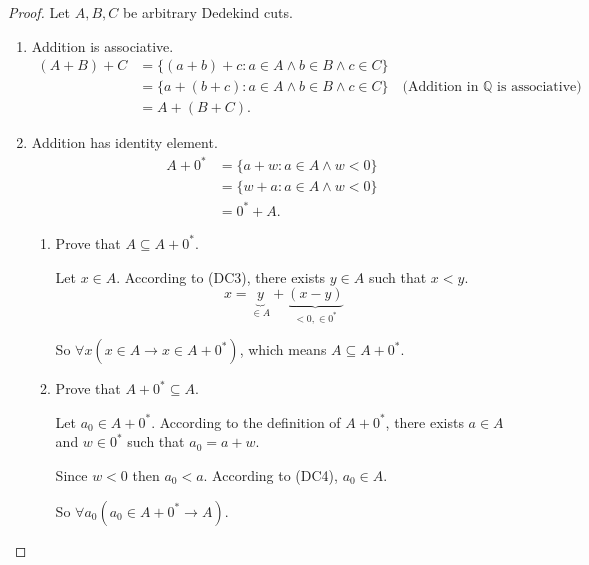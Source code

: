\begin{proof}
    Let $A, B, C$ be arbitrary Dedekind cuts.
    \begin{enumerate}[label = (F\arabic*)]
        \item Addition is associative.
              \begin{align*}
                  (A + B) + C & = \{ (a + b) + c : a\in A\land b\in B\land c\in C \}                                                       \\
                              & = \{ a + (b + c) : a\in A\land b\in B\land c\in C \} \quad\text{(Addition in $\mathbb{Q}$ is associative)} \\
                              & = A + (B + C).
              \end{align*}
        \item Addition has identity element.
              \begin{align*}
                  A + {0}^{*} & = \{ a + w : a\in A\land w < 0 \} \\
                              & = \{ w + a : a\in A\land w < 0 \} \\
                              & = {0}^{*} + A.
              \end{align*}

              \begin{enumerate}[label={\textbf{Step \arabic*.}}]
                  \item Prove that $A \subseteq A + {0}^{*}$.

                        Let $x\in A$. According to (DC3), there exists $y\in A$ such that $x < y$.
                        \[
                            x = \underbrace{y}_{\in A} + \underbrace{(x - y)}_{< 0, \in {0}^{*}}
                        \]

                        So $\forall x(x\in A \rightarrow x\in A + {0}^{*})$, which means $A \subseteq A + {0}^{*}$.
                  \item Prove that $A + {0}^{*} \subseteq A$.

                        Let $a_{0}\in A + {0^{*}}$. According to the definition of $A + {0}^{*}$, there exists $a\in A$ and $w\in {0}^{*}$ such that $a_{0} = a + w$.

                        Since $w < 0$ then $a_{0} < a$. According to (DC4), $a_{0}\in A$.

                        So $\forall a_{0}(a_{0}\in A + {0}^{*} \rightarrow A)$.
              \end{enumerate}


\end{enumerate}
\end{proof}
